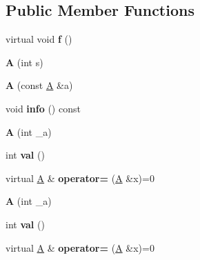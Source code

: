\subsection*{Public Member Functions}
\begin{DoxyCompactItemize}
\item 
\hypertarget{classA_a4568a90d407ebae1b5ae9155dbc263af}{virtual void {\bfseries f} ()}\label{classA_a4568a90d407ebae1b5ae9155dbc263af}

\item 
\hypertarget{classA_a5c9537376ae61a89cc327b51d7f3f0b3}{{\bfseries A} (int s)}\label{classA_a5c9537376ae61a89cc327b51d7f3f0b3}

\item 
\hypertarget{classA_ae2af0b03e615d3b68e161cf29b88d90c}{{\bfseries A} (const \hyperlink{classA}{A} \&a)}\label{classA_ae2af0b03e615d3b68e161cf29b88d90c}

\item 
\hypertarget{classA_a3002802633cd4b7d9a226c15ab57a6da}{void {\bfseries info} () const }\label{classA_a3002802633cd4b7d9a226c15ab57a6da}

\item 
\hypertarget{classA_a02a14e9e9c66cc288c34555988ce9410}{{\bfseries A} (int \-\_\-a)}\label{classA_a02a14e9e9c66cc288c34555988ce9410}

\item 
\hypertarget{classA_a8010f5e403b1f9d104360d5c77e68d68}{int {\bfseries val} ()}\label{classA_a8010f5e403b1f9d104360d5c77e68d68}

\item 
\hypertarget{classA_a1aef5e4848d8935206fcc6ca04b80db9}{virtual \hyperlink{classA}{A} \& {\bfseries operator=} (\hyperlink{classA}{A} \&x)=0}\label{classA_a1aef5e4848d8935206fcc6ca04b80db9}

\item 
\hypertarget{classA_a02a14e9e9c66cc288c34555988ce9410}{{\bfseries A} (int \-\_\-a)}\label{classA_a02a14e9e9c66cc288c34555988ce9410}

\item 
\hypertarget{classA_a8010f5e403b1f9d104360d5c77e68d68}{int {\bfseries val} ()}\label{classA_a8010f5e403b1f9d104360d5c77e68d68}

\item 
\hypertarget{classA_a1aef5e4848d8935206fcc6ca04b80db9}{virtual \hyperlink{classA}{A} \& {\bfseries operator=} (\hyperlink{classA}{A} \&x)=0}\label{classA_a1aef5e4848d8935206fcc6ca04b80db9}

\end{DoxyCompactItemize}
